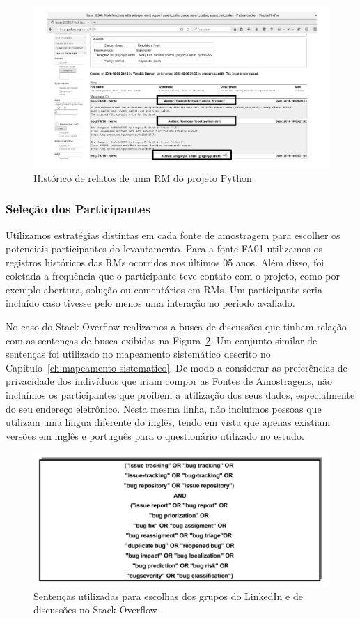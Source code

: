 \begin{figure}[htpb]
	\centering
	\includegraphics[width=0.7\linewidth]{./chapter-pesquisa-com-profissionais/img/historico-rm-python.pdf}
	\caption{Histórico de relatos de uma RM do projeto Python}
\label{fig:historico-rm-python}
\end{figure}

\subsubsection{Seleção dos Participantes}
\label{subsubsec:pesquisa_profissionais_plano_pesquisa}

Utilizamos estratégias distintas em cada fonte de amostragem para escolher os
potenciais participantes do levantamento. Para a fonte FA01 utilizamos os
registros históricos das RMs ocorridos nos últimos 05 anos. Além disso, foi
coletada a frequência que o participante teve contato com o projeto, como por
exemplo abertura, solução ou comentários em RMs. Um participante seria incluído
caso tivesse pelo menos uma interação no período avaliado.

No caso do Stack Overflow realizamos a busca de discussões que tinham relação
com as sentenças de busca exibidas na Figura~\ref{fig:setencas-grupos}. Um
conjunto similar de sentenças foi utilizado no mapeamento sistemático descrito
no Capítulo~\ref{ch:mapeamento-sistematico}. De modo a considerar as
preferências de privacidade dos indivíduos que iriam compor as Fontes de
Amostragens, não incluímos os participantes que proíbem a utilização dos seus
dados, especialmente do seu endereço eletrônico. Nesta mesma linha, não
incluímos pessoas que utilizam uma língua diferente do inglês, tendo em vista
que apenas existiam versões em inglês e português para o questionário utilizado
no estudo.

\begin{figure}[htpb]
	\centering
	\includegraphics[width=0.7\linewidth]{./chapter-pesquisa-com-profissionais/img/setencas-grupos.pdf}
	\caption{Sentenças utilizadas para escolhas dos grupos do LinkedIn e de
		discussões no Stack Overflow}
\label{fig:setencas-grupos}
\end{figure}

